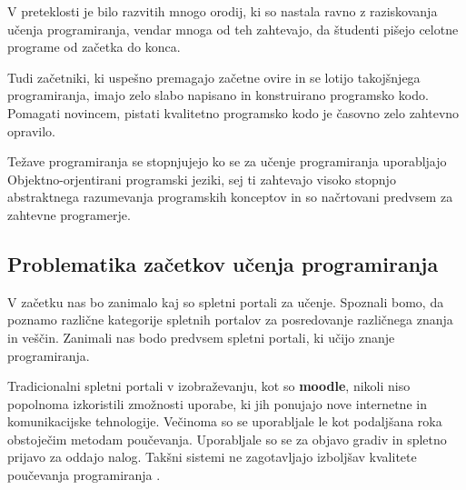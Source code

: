 V preteklosti je bilo razvitih mnogo orodij, ki so nastala ravno z
raziskovanja učenja programiranja, vendar mnoga od teh zahtevajo, da
študenti pišejo celotne programe od začetka do konca.

Tudi začetniki, ki uspešno premagajo začetne ovire in se lotijo
takojšnjega programiranja, imajo zelo slabo napisano in konstruirano
programsko kodo. Pomagati novincem, pistati kvalitetno programsko kodo
je časovno zelo zahtevno opravilo.

Težave programiranja se stopnjujejo ko se za učenje programiranja
uporabljajo Objektno-orjentirani programski jeziki, sej ti zahtevajo
visoko stopnjo abstraktnega razumevanja programskih konceptov in so
načrtovani predvsem za zahtevne programerje.



\subsection{Problematika začetkov učenja programiranja}
\label{sec:Problematika_začetkov_učenja_programiranja}







V začetku nas bo zanimalo kaj so spletni portali za učenje. Spoznali
bomo, da poznamo različne kategorije spletnih portalov za posredovanje
različnega znanja in veščin. Zanimali nas bodo  predvsem spletni
portali, ki učijo znanje programiranja.

Tradicionalni spletni portali v izobraževanju, kot so \textbf{moodle},
nikoli niso popolnoma izkoristili zmožnosti uporabe, ki jih ponujajo
nove internetne in komunikacijske tehnologije. Večinoma so se
uporabljale le kot podaljšana roka obstoječim metodam
poučevanja. Uporabljale so se za objavo gradiv in spletno prijavo za
oddajo nalog. Takšni sistemi ne zagotavljajo izboljšav kvalitete
poučevanja programiranja \cite{ITaLCP_DistanceEdu}.


